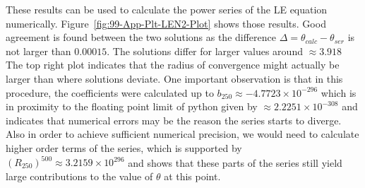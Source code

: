 These results can be used to calculate the power series of the \ac {LE} equation numerically.
Figure~\ref{fig:99-App-Plt-LEN2-Plot} shows those results.
Good agreement is found between the two solutions
as the difference $\Delta=\theta_{calc}-\theta_{ser}$ is not larger than $0.00015$.
The solutions differ for larger values around $\approx3.918$
The top right plot indicates that the radius of convergence might actually be larger than
where solutions deviate.
One important observation is that in this procedure, the coefficients were calculated up to $b_{250}\approx-4.7723\times10^{-296}$ which is in proximity to the floating point limit of python given by $\approx2.2251\times10^{-308}$ and indicates that numerical errors may be the reason the series starts to diverge.
Also in order to achieve sufficient numerical precision, we would need to calculate higher order terms of the series, which is supported by $(R_{250})^{500}\approx3.2159\times10^{296}$ and shows that these parts of the series still yield large contributions to the value of $\theta$ at this point.
%
%
%
